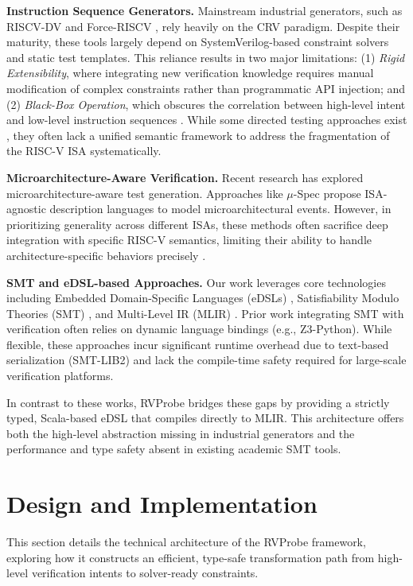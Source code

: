 \documentclass[sigconf]{acmart}
\begin{document}
\textbf{Instruction Sequence Generators.} Mainstream industrial generators, such as RISCV-DV \cite{9} and Force-RISCV \cite{10}, rely heavily on the CRV paradigm. Despite their maturity, these tools largely depend on SystemVerilog-based constraint solvers and static test templates. This reliance results in two major limitations: (1) \textit{Rigid Extensibility}, where integrating new verification knowledge requires manual modification of complex constraints rather than programmatic API injection; and (2) \textit{Black-Box Operation}, which obscures the correlation between high-level intent and low-level instruction sequences \cite{11, 12}. While some directed testing approaches exist \cite{13}, they often lack a unified semantic framework to address the fragmentation of the RISC-V ISA systematically.

\textbf{Microarchitecture-Aware Verification.} Recent research has explored microarchitecture-aware test generation. Approaches like $\mu$-Spec \cite{14} propose ISA-agnostic description languages to model microarchitectural events. However, in prioritizing generality across different ISAs, these methods often sacrifice deep integration with specific RISC-V semantics, limiting their ability to handle architecture-specific behaviors precisely \cite{15, 16}.

\textbf{SMT and eDSL-based Approaches.} Our work leverages core technologies including Embedded Domain-Specific Languages (eDSLs) \cite{3}, Satisfiability Modulo Theories (SMT) \cite{4}, and Multi-Level IR (MLIR) \cite{5}. Prior work integrating SMT with verification often relies on dynamic language bindings (e.g., Z3-Python). While flexible, these approaches incur significant runtime overhead due to text-based serialization (SMT-LIB2) and lack the compile-time safety required for large-scale verification platforms.

In contrast to these works, RVProbe bridges these gaps by providing a strictly typed, Scala-based eDSL that compiles directly to MLIR. This architecture offers both the high-level abstraction missing in industrial generators and the performance and type safety absent in existing academic SMT tools.

\section{Design and Implementation}\label{Sec3}

This section details the technical architecture of the RVProbe framework, exploring how it constructs an efficient, type-safe transformation path from high-level verification intents to solver-ready constraints.
\end{document}
